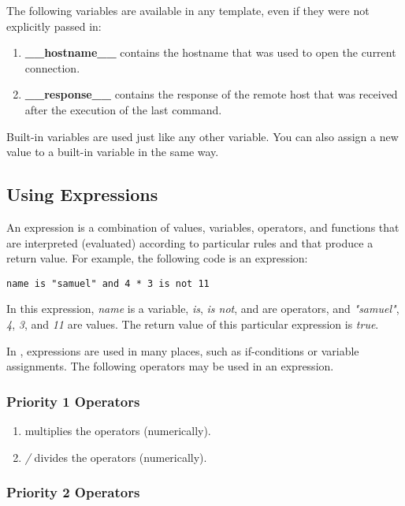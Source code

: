 The following variables are available in any \product template, even if 
they were not explicitly passed in:

\begin{enumerate}
\item {\bf \_\_hostname\_\_} contains the hostname that was used to open the 
current connection.
\item {\bf \_\_response\_\_} contains the response of the remote host that was 
received after the execution of the last command. 
\end{enumerate}

Built-in variables are used just like any other variable. You can also 
assign a new value to a built-in variable in the same way. 


\subsection{Using Expressions}

An expression is a combination of values, variables, operators, and functions 
that are interpreted (evaluated) according to particular rules and that 
produce a return value. For example, the following code is an expression:

\begin{lstlisting}
name is "samuel" and 4 * 3 is not 11
\end{lstlisting}

In this expression, {\it name} is a variable, {\it is}, {\it is not}, and 
{\it *} are operators, and {\it "samuel"}, {\it 4}, {\it 3}, and {\it 11} 
are values. The return value of this particular expression is {\it true}.

In \product, expressions are used in many places, such as if-conditions or 
variable assignments. The following operators may be used in an expression. 


\subsubsection{Priority 1 Operators}

\begin{enumerate}
\item {\it *} multiplies the operators (numerically).
\item {\it /} divides the operators (numerically).
\end{enumerate}


\subsubsection{Priority 2 Operators}

